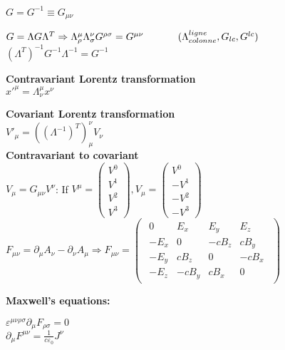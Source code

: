 $G=G^{-1}\equiv G_{\mu\nu}$

$G=\Lambda G \Lambda^T \Rightarrow\Lambda_\rho^\mu\Lambda_\sigma^\nu G^{\rho\sigma}=G^{\mu\nu} \hspace{0.1\textwidth}(\Lambda^{ligne}_{colonne}, G_{lc}, G^{lc})$  
$(\Lambda^T)^{-1}G^{-1}\Lambda^{-1}=G^{-1}$


\textbf{Contravariant Lorentz transformation}\\
$x'^{\mu}=\Lambda_{\nu}^{\mu}x^\nu$

\textbf{Covariant Lorentz transformation}\\
$V'_{\mu}=((\Lambda^{-1})^T)_{\mu}^{\nu} V_{\nu}$\\

\textbf{Contravariant to covariant}\\
$V_\mu=G_{\mu\nu}V^\nu$: \hspace{0.05\textwidth}
If $V^\mu=
\begin{pmatrix}
V^0\\
V^1\\
V^2\\
V^3
\end{pmatrix},
V_\mu=
\begin{pmatrix}
V^0\\
-V^1\\
-V^2\\
-V^3
\end{pmatrix}$\\


$F_{\mu\nu}=\partial_\mu A_\nu-\partial_\nu A_\mu \Rightarrow F_{\mu\nu}=\begin{pmatrix}
\begin{array}{cccc}
    0 & E_x & E_y & E_z \\ 
    -E_x & 0 & -c B_z & c B_y \\ 
    -E_y&cB_z  & 0 & -c B_x \\ 
    -E_z&  -cB_y& cB_x & 0
\end{array} 
\end{pmatrix}$

\textbf{Maxwell's equations:}

$\varepsilon^{\mu \nu \rho \sigma}\partial_\mu F_{\rho \sigma}=0$\\
$\partial_\mu F^{\mu\nu}=\frac{1}{c\varepsilon_0}J^\nu$








